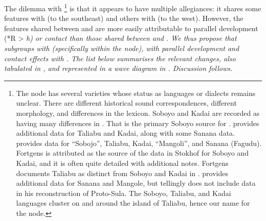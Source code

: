 The dilemma with \footnote{
		The  node
		has several varieties whose status as languages or dialects remains unclear.
		There are different historical sound correspondences,
		different morphology, and differences in the lexicon.
		Soboyo and Kadai are recorded as having many differences in \citet{Fortgens1921}.
		That is the primary Soboyo source for \citet{Blust1981}.
		\citet{Collins1981,Collins1989} provides additional data for Taliabu
		and Kadai, along with some Sanana data.
		\citet{Stokhof1980b} provides data for “Sobojo”,
		Taliabu, Kadai, “Mangoli”, and Sanana (Fagudu).
		Fortgens is attributed as the source of the data in Stokhof for
		Soboyo and Kadai, and it is often quite detailed with additional notes.
		Fortgens documents Taliabu as distinct from Soboyo
		and Kadai in \citet{Stokhof1980b}.
		\citet{Bloyd2015,Bloyd2020} provides additional data for Sanana
		and Mangole, but tellingly does not include  data
		in his reconstruction of Proto-Sula.
		The Soboyo, Taliabu, and Kadai languages cluster on
		and around the island of Taliabu,
		hence our name for the node.}
is that it appears to have multiple
allegiances: it shares some features with  (to
the southeast) and others with  (to the west).
However, the features shared between 
and  are more easily attributable to parallel
development (*R > \it{h}) or  contact than those shared between
 and .
We thus propose that  subgroups with 
(specifically within the  node),
with parallel development and contact effects with .
The list below summarises the relevant changes,
also tabulated in , and represented in a wave diagram in .
Discussion follows.

